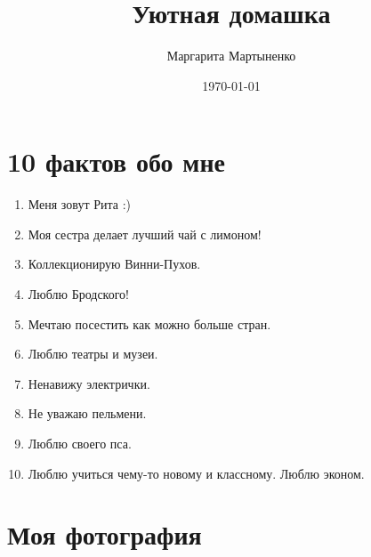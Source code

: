 \documentclass[12pt, a4paper]{article}
\author{Маргарита Мартыненко}
\title{Уютная домашка}
\date{\today}
\begin{document}
\maketitle

\section{10 фактов обо мне}
\begin{enumerate}
\item Меня зовут Рита :)
\item Моя сестра делает лучший чай с лимоном! 
\item Коллекционирую Винни-Пухов. \Heart
\item Люблю Бродского! 
\item Мечтаю посестить как можно больше стран. 
\item Люблю театры и музеи. 
\item Ненавижу электрички. 
\item Не уважаю пельмени.
\item Люблю своего пса. 
\item Люблю учиться чему-то новому и классному. Люблю эконом. 
\end{enumerate}

\newpage
\section{Моя фотография}
\end{document}
